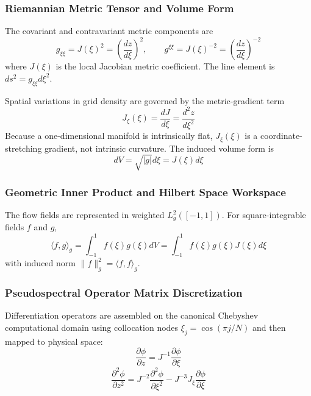 \subsubsection{Riemannian Metric Tensor and Volume Form}
The covariant and contravariant metric components are
\begin{equation}
    g_{\xi\xi} = J(\xi)^2 = \left(\frac{dz}{d\xi}\right)^2, \qquad
    g^{\xi\xi} = J(\xi)^{-2} = \left(\frac{dz}{d\xi}\right)^{-2}
\end{equation}
where $J(\xi)$ is the local Jacobian metric coefficient. The line element is $ds^2 = g_{\xi\xi} d\xi^2$.

Spatial variations in grid density are governed by the metric-gradient term
\begin{equation}
    J_{\xi}(\xi) = \frac{dJ}{d\xi} = \frac{d^2z}{d\xi^2}
\end{equation}
Because a one-dimensional manifold is intrinsically flat, $J_{\xi}(\xi)$ is a coordinate-stretching gradient, not intrinsic curvature. The induced volume form is
\begin{equation}
    dV = \sqrt{|g|} d\xi = J(\xi) d\xi
\end{equation}

\subsubsection{Geometric Inner Product and Hilbert Space Workspace}
The flow fields are represented in weighted $L^2_g([-1,1])$. For square-integrable fields $f$ and $g$,
\begin{equation}
    \langle f, g \rangle_g = \int_{-1}^{1} f(\xi) g(\xi) dV = \int_{-1}^{1} f(\xi) g(\xi) J(\xi) d\xi
\end{equation}
with induced norm $\|f\|_g^2 = \langle f, f \rangle_g$.

\subsubsection{Pseudospectral Operator Matrix Discretization}
Differentiation operators are assembled on the canonical Chebyshev computational domain using collocation nodes $\xi_j = \cos(\pi j / N)$ and then mapped to physical space:
\begin{equation}
    \frac{\partial \phi}{\partial z} = J^{-1} \frac{\partial \phi}{\partial \xi}
\end{equation}
\begin{equation}
    \frac{\partial^2 \phi}{\partial z^2} = J^{-2} \frac{\partial^2 \phi}{\partial \xi^2} - J^{-3} J_{\xi} \frac{\partial \phi}{\partial \xi}
\end{equation}

